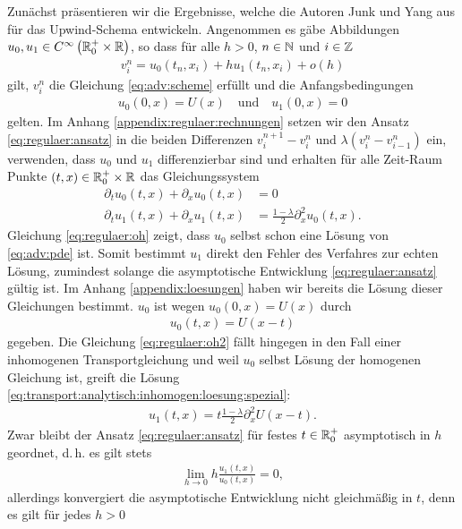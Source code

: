 Zunächst präsentieren wir die Ergebnisse, welche die Autoren Junk und Yang aus \cite{Junk2004} für das Upwind-Schema entwickeln.
Angenommen es gäbe Abbildungen $u_0, u_1 \in C^\infty\left( \mathbb R^+_0 \times \mathbb R \right)$, so dass für alle $h > 0$, $n \in \mathbb N$ und $i \in \mathbb Z$
\begin{align}\label{eq:regulaer:ansatz}
v^n_i = u_0(t_n,x_i) + h u_1(t_n,x_i) + o(h)
\end{align}
gilt, $v^n_i$ die Gleichung \eqref{eq:adv:scheme} erfüllt und die Anfangsbedingungen
\begin{align}\label{eq:regulaer:anfangsbedingungen}
u_0(0,x) = U(x) \quad \text{und} \quad u_1(0, x) = 0
\end{align}
gelten.
Im Anhang \ref{appendix:regulaer:rechnungen} setzen wir den Ansatz \eqref{eq:regulaer:ansatz} in die beiden Differenzen $v^{n+1}_i - v^n_i$ und $\lambda ( v^n_i - v^n_{i-1} )$ ein, verwenden, dass $u_0$ und $u_1$ differenzierbar sind und erhalten für alle Zeit-Raum Punkte $(t,x) \in \mathbb R^+_0 \times \mathbb R$ das Gleichungssystem 
\begin{align}
\label{eq:regulaer:oh}
\partial_t u_0(t,x) + \partial_x u_0(t,x) &= 0\\
\label{eq:regulaer:oh2}
\partial_t u_1(t,x) + \partial_x u_1(t,x) &= \frac{1-\lambda}{2} \partial^2_x u_0(t,x).
\end{align}
Gleichung \eqref{eq:regulaer:oh} zeigt, dass $u_0$ selbst schon eine Lösung von \eqref{eq:adv:pde} ist.
Somit bestimmt $u_1$ direkt den Fehler des Verfahres zur echten Lösung, zumindest solange die asymptotische Entwicklung \eqref{eq:regulaer:ansatz} gültig ist.
Im Anhang \ref{appendix:loesungen} haben wir bereits die Lösung dieser Gleichungen bestimmt.
$u_0$ ist wegen $u_0(0,x) = U(x)$ durch
\begin{align*}
u_0(t,x) = U(x-t)
\end{align*}
gegeben.
Die Gleichung \eqref{eq:regulaer:oh2} fällt hingegen in den Fall einer inhomogenen Transportgleichung und weil $u_0$ selbst Lösung der homogenen Gleichung ist, greift die Lösung \eqref{eq:transport:analytisch:inhomogen:loesung:spezial}:
\begin{align*}
u_1(t,x) = t \frac{1-\lambda}{2} \partial^2_x U(x-t).
\end{align*}
Zwar bleibt der Ansatz \eqref{eq:regulaer:ansatz} für festes $t \in \mathbb R^+_0$ asymptotisch in $h$ geordnet, d.\,h. es gilt stets
\begin{align*}
\lim_{h \to 0} h \frac{u_1(t,x)}{u_0(t,x)} = 0,
\end{align*}
allerdings konvergiert die asymptotische Entwicklung nicht gleichmäßig in $t$, denn es gilt für jedes $h > 0$
